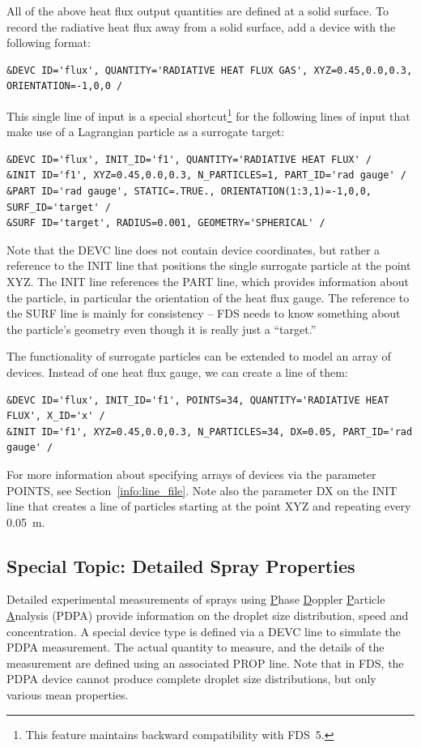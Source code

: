 \documentclass[11pt]{book}
\begin{document}
All of the above heat flux output quantities are defined at a solid surface. To record the radiative heat flux away from a solid surface, add a device with the following format:
\begin{lstlisting}
&DEVC ID='flux', QUANTITY='RADIATIVE HEAT FLUX GAS', XYZ=0.45,0.0,0.3, ORIENTATION=-1,0,0 /
\end{lstlisting}
This single line of input is a special shortcut\footnote{This feature maintains backward compatibility with FDS~5.} for the following lines of input that make use of a Lagrangian particle as a surrogate target:
\begin{lstlisting}
&DEVC ID='flux', INIT_ID='f1', QUANTITY='RADIATIVE HEAT FLUX' /
&INIT ID='f1', XYZ=0.45,0.0,0.3, N_PARTICLES=1, PART_ID='rad gauge' /
&PART ID='rad gauge', STATIC=.TRUE., ORIENTATION(1:3,1)=-1,0,0, SURF_ID='target' /
&SURF ID='target', RADIUS=0.001, GEOMETRY='SPHERICAL' /
\end{lstlisting}
Note that the {\ct DEVC} line does not contain device coordinates, but rather a reference to the {\ct INIT} line that positions the single surrogate particle at the point {\ct XYZ}. The {\ct INIT} line references the {\ct PART} line, which provides information about the particle, in particular the orientation of the heat flux gauge. The reference to the {\ct SURF} line is mainly for consistency -- FDS needs to know something about the particle's geometry even though it is really just a ``target.''

The functionality of surrogate particles can be extended to model an array of devices. Instead of one heat flux gauge, we can create a line of them:
\begin{lstlisting}
&DEVC ID='flux', INIT_ID='f1', POINTS=34, QUANTITY='RADIATIVE HEAT FLUX', X_ID='x' /
&INIT ID='f1', XYZ=0.45,0.0,0.3, N_PARTICLES=34, DX=0.05, PART_ID='rad gauge' /
\end{lstlisting}
For more information about specifying arrays of devices via the parameter {\ct POINTS}, see Section~\ref{info:line_file}. Note also the parameter {\ct DX} on the {\ct INIT} line that creates a line of particles starting at the point {\ct XYZ} and repeating every 0.05~m.




\subsection{Special Topic: Detailed Spray Properties}
\label{PDPA}

Detailed experimental measurements of sprays using \underline{P}hase \underline{D}oppler \underline{P}article
\underline{A}nalysis (PDPA) provide information on the droplet size distribution, speed and concentration.
A special device type is defined via a {\ct DEVC} line to simulate the PDPA measurement. The actual quantity to measure, and the details of the
measurement are defined using an associated {\ct PROP} line. Note that in FDS, the PDPA device cannot produce complete droplet size
distributions, but only various mean properties.
\end{document}
